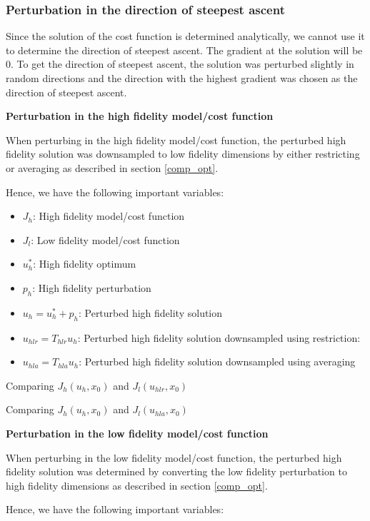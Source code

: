 \documentclass{article}
\begin{document}
\subsubsection{Perturbation in the direction of steepest ascent}

Since the solution of the cost function is determined analytically, we cannot use it to determine the direction of steepest ascent.
The gradient at the solution will be 0. To get the direction of steepest ascent, the solution was perturbed slightly in random directions and the direction with the highest gradient
was chosen as the direction of steepest ascent.

\textbf{Perturbation in the high fidelity model/cost function}

When perturbing in the high fidelity model/cost function, the perturbed high fidelity solution was downsampled to low fidelity
dimensions by either restricting or averaging as described in section \ref{comp_opt}.

Hence, we have the following important variables:

\begin{itemize}
  \item $J_h$: High fidelity model/cost function
  \item $J_l$: Low fidelity model/cost function
  \item $u_h^*$: High fidelity optimum
  \item $p_h$: High fidelity perturbation
  \item $u_h = u_h^* + p_h$: Perturbed high fidelity solution
  \item $u_{hlr} = T_{hlr} u_h$: Perturbed high fidelity solution downsampled using restriction:
  \item $u_{hla} = T_{hla} u_h$: Perturbed high fidelity solution downsampled using averaging
\end{itemize}

Comparing $J_h(u_h, x_0)$ and $J_l(u_{hlr}, x_0)$

Comparing $J_h(u_h, x_0)$ and $J_l(u_{hla}, x_0)$

\textbf{Perturbation in the low fidelity model/cost function}

When perturbing in the low fidelity model/cost function, the perturbed high fidelity solution was determined
by converting the low fidelity perturbation to high fidelity dimensions as described in section \ref{comp_opt}.

Hence, we have the following important variables:
\end{document}
